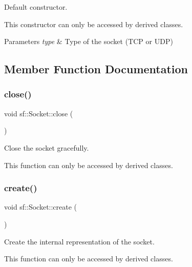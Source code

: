 Default constructor. 

This constructor can only be accessed by derived classes.


\begin{DoxyParams}{Parameters}
{\em type} & Type of the socket (T\+CP or U\+DP) \\
\hline
\end{DoxyParams}


\subsection{Member Function Documentation}
\mbox{\label{classsf_1_1_socket_a71f2f5c2aa99e01cafe824fee4c573be}} 
\subsubsection{\texorpdfstring{close()}{close()}}
{\footnotesize\ttfamily void sf\+::\+Socket\+::close (\begin{DoxyParamCaption}{ }\end{DoxyParamCaption})\hspace{0.3cm}{\ttfamily [protected]}}



Close the socket gracefully. 

This function can only be accessed by derived classes. \mbox{\label{classsf_1_1_socket_aafbe140f4b1921e0d19e88cf7a61dcbc}} 
\subsubsection{\texorpdfstring{create()}{create()}\hspace{0.1cm}{\footnotesize\ttfamily [1/2]}}
{\footnotesize\ttfamily void sf\+::\+Socket\+::create (\begin{DoxyParamCaption}{ }\end{DoxyParamCaption})\hspace{0.3cm}{\ttfamily [protected]}}



Create the internal representation of the socket. 

This function can only be accessed by derived classes. \mbox{\label{classsf_1_1_socket_af1dd898f7aa3ead7ff7b2d1c20e97781}} 
